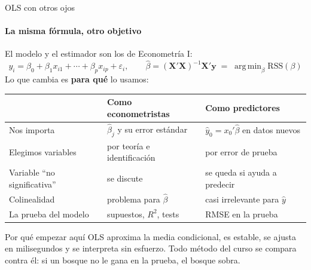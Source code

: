 \documentclass{beamer}
\newcommand{\1}{\mathbb{I}}
\newcommand{\RSS}{\mathrm{RSS}}
\DeclareMathOperator*{\argmin}{arg\,min}
\begin{document}
\begin{frame}{OLS con otros ojos}
\framesubtitle{La misma fórmula, otro objetivo}
\small
El modelo y el estimador son los de Econometría I:
\[ y_i = \beta_0 + \beta_1 x_{i1} + \cdots + \beta_p x_{ip} + \varepsilon_i, \qquad \hat{\beta} = (\mathbf{X}'\mathbf{X})^{-1}\mathbf{X}'\mathbf{y} \;=\; \argmin_{\beta} \RSS(\beta) \]
\pause
Lo que cambia es \textbf{para qué} lo usamos:
\begin{center}
\scriptsize
\setlength{\tabcolsep}{4pt}
\renewcommand{\arraystretch}{1.2}
\begin{tabular}{lll}
\hline
 & \textbf{Como econometristas} & \textbf{Como predictores} \\
\hline
Nos importa & $\hat{\beta}_j$ y su error estándar & $\hat{y}_0 = x_0'\hat{\beta}$ en datos nuevos \\
Elegimos variables & por teoría e identificación & por error de prueba \\
Variable ``no significativa'' & se discute & se queda si ayuda a predecir \\
Colinealidad & problema para $\hat{\beta}$ & casi irrelevante para $\hat{y}$ \\
La prueba del modelo & supuestos, $R^2$, tests & RMSE en la prueba \\
\hline
\end{tabular}
\end{center}
\pause
\vspace{0.15cm}
\begin{block}{Por qué empezar aquí}
OLS aproxima la media condicional, es estable, se ajusta en milisegundos y se interpreta sin esfuerzo. Todo método del curso se compara contra él: si un bosque no le gana en la prueba, el bosque sobra.
\end{block}
\end{frame}
\end{document}
